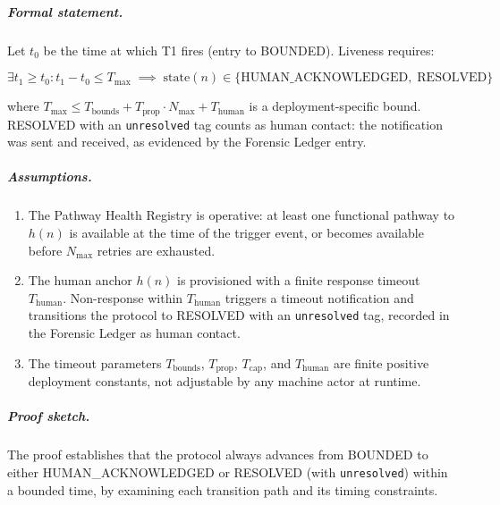 \subparagraph{Formal statement.} Let $t_0$ be the time at which T1 fires (entry to BOUNDED). Liveness requires:

\begin{equation}
\exists t_1 \geq t_0 : t_1 - t_0 \leq T_{\max}
\;\implies\;
\text{state}(n) \in \{\text{HUMAN\_ACKNOWLEDGED},\; \text{RESOLVED}\}
\end{equation}

where $T_{\max} \leq T_{\text{bounds}} + T_{\text{prop}} \cdot N_{\max} + T_{\text{human}}$ is a deployment-specific bound. RESOLVED with an \texttt{unresolved} tag counts as human contact: the notification was sent and received, as evidenced by the Forensic Ledger entry.

\subparagraph{Assumptions.}
\begin{enumerate}
\item[\textbf{A2.1}] The Pathway Health Registry is operative: at least one functional pathway to $h(n)$ is available at the time of the trigger event, or becomes available before $N_{\max}$ retries are exhausted.
\item[\textbf{A2.2}] The human anchor $h(n)$ is provisioned with a finite response timeout $T_{\text{human}}$. Non-response within $T_{\text{human}}$ triggers a timeout notification and transitions the protocol to RESOLVED with an \texttt{unresolved} tag, recorded in the Forensic Ledger as human contact.
\item[\textbf{A2.3}] The timeout parameters $T_{\text{bounds}}$, $T_{\text{prop}}$, $T_{\text{cap}}$, and $T_{\text{human}}$ are finite positive deployment constants, not adjustable by any machine actor at runtime.
\end{enumerate}

\subparagraph{Proof sketch.} The proof establishes that the protocol always advances from BOUNDED to either HUMAN\_ACKNOWLEDGED or RESOLVED (with \texttt{unresolved}) within a bounded time, by examining each transition path and its timing constraints.

